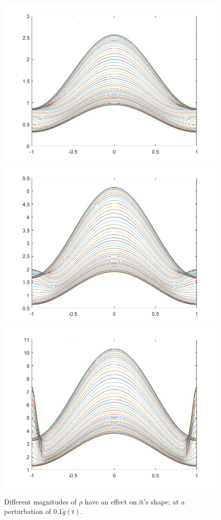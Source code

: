 \documentclass[11pt, a4paper]{article}
\theoremstyle{definition}
\begin{document}
\begin{figure}[h]
	\includegraphics[scale=0.3]{Nexprho2.jpg}
	\includegraphics[scale=0.3]{Nexprho2a.jpg}
	\includegraphics[scale=0.3]{Nexprho2b.jpg}
	\caption{Different magnitudes of $\rho$ have an effect on it's shape; at a perturbation of $0.1 \tilde g(t)$.}
	\label{Nexperr3}
\end{figure}
\end{document}
